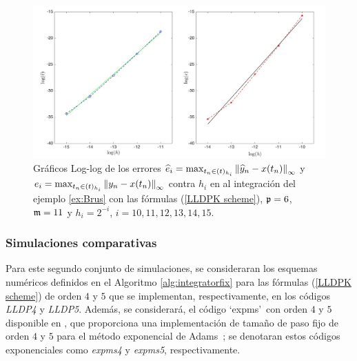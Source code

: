 \begin{figure}[htb]
	\begin{center}
		\includegraphics[scale=0.45]{Graphics/lldp/LLDP-plots.jpg}
		\caption{ Gráficos Log-log de los errores $\widehat{e}_i=\max_{t_n\in(t)_{h_i}}\left\lVert \widehat{y}_n-x(t_n) \right\rVert_\infty$ y $e_i=\max_{t_n\in(t)_{h_i}}\left\lVert y_n-x(t_n) \right\rVert_\infty$ contra $h_i$ en al integración del ejemplo \ref{ex:Brus} con las fórmulas (\ref{LLDPK scheme}), $\mathfrak{p}=6$, $\mathfrak{m}=11$ y $h_i=2^{-i}$, $i=10,11,12,13,14,15$.}
		\label{fig:num-exp-lldp-fix-step:Fig4}
	\end{center}
\end{figure}

\subsubsection{Simulaciones comparativas}
Para este segundo conjunto de simulaciones, se consideraran los esquemas numéricos definidos en el Algoritmo \ref{alg:integratorfix} para las fórmulas (\ref{LLDPK scheme}) de orden $4$ y $5$ que se implementan, respectivamente, en los códigos \emph{LLDP4} y \emph{LLDP5}. Además, se considerará, el código \textquoteleft expms\textquoteright~con orden $4$ y $5$ disponible en \cite{jansing2011expode}, que proporciona una implementación de tamaño de paso fijo de orden $4$ y $5$ para el método exponencial de Adams~\cite{hochbruck2011exponential}; se denotaran estos códigos exponenciales como \emph{expms4} y \emph{expms5}, respectivamente.

